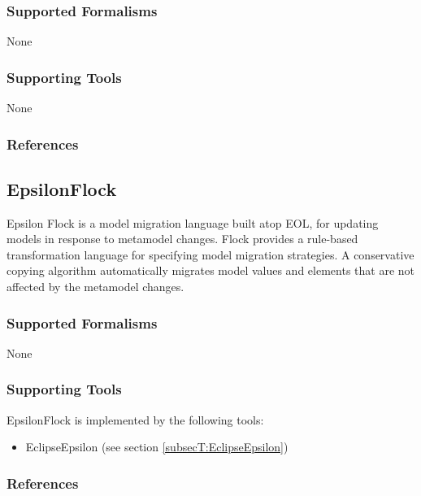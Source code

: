 \subsubsection{Supported Formalisms}

None


\subsubsection{Supporting Tools}

None


\subsubsection{References}





\subsection{EpsilonFlock}
\label{subsecL:EpsilonFlock}


Epsilon Flock is a model migration language built atop EOL, for updating models in response to metamodel changes. Flock provides a rule-based transformation language for specifying model migration strategies. A conservative copying algorithm automatically migrates model values and elements that are not affected by the metamodel changes.

\subsubsection{Supported Formalisms}

None


\subsubsection{Supporting Tools}

EpsilonFlock is implemented by the following tools:
\begin{itemize}
	\item EclipseEpsilon (see section \ref{subsecT:EclipseEpsilon})
\end{itemize}


\subsubsection{References}





